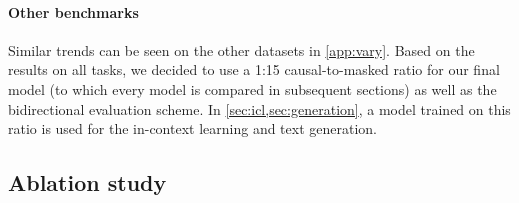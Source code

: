 \paragraph{Other benchmarks} Similar trends can be seen on the other datasets in \cref{app:vary}. Based on the results on all tasks, we decided to use a 1:15 causal-to-masked ratio for our final model (to which every model is compared in subsequent sections) as well as the bidirectional evaluation scheme. In \cref{sec:icl,sec:generation}, a model trained on this ratio is used for the in-context learning and text generation.

\subsection{Ablation study}

\begin{table}[!t]
\caption{\textbf{Ablation study}\hspace{1.5em}Comparison of different model configurations proposed in , and corpus mixtures. The top row shows the performance of the final model (with all modifications), the middle rows show the absolute performance difference of models with one modification less, and the last group of rows shows the performance difference of GPT-BERT models trained on corpora from single sources.}
\label{tab:ablation}
\end{table}

